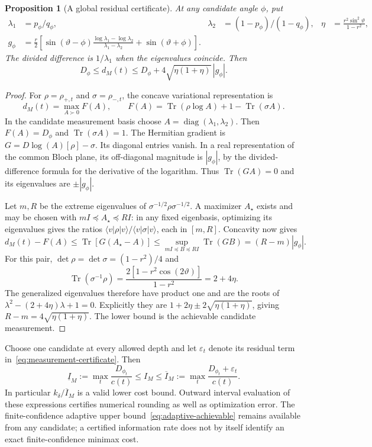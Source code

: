\documentclass[11pt,a4paper]{article}
\newcommand{\ket}[1]{\lvert #1\rangle}
\newcommand{\bra}[1]{\langle #1\rvert}
\newcommand{\Tr}{\operatorname{Tr}}
\newcommand{\diag}{\operatorname{diag}}
\newtheorem{proposition}[theorem]{Proposition}
\theoremstyle{definition}
\theoremstyle{remark}
\numberwithin{equation}{section}
\begin{document}
\begin{proposition}[A global residual certificate]\label{prop:residual}
At any candidate angle $\phi$, put
\begin{align}
 \lambda_1&=p_\phi/q_\phi,&
 \lambda_2&=(1-p_\phi)/(1-q_\phi),&
 \eta&=\frac{r^2\sin^2\vartheta}{1-r^2},\\
 g_\phi&=\frac r2\left[
  \sin(\vartheta-\phi)
  \frac{\log\lambda_1-\log\lambda_2}{\lambda_1-\lambda_2}
  +\sin(\vartheta+\phi)\right].&&&\label{eq:measurement-gradient}
\end{align}
The divided difference is $1/\lambda_1$ when the eigenvalues coincide.
Then
\begin{equation}\label{eq:measurement-certificate}
 D_\phi\leq d_M(t)\leq D_\phi+
                       4\sqrt{\eta(1+\eta)}\,|g_\phi|.
\end{equation}
\end{proposition}
\begin{proof}
For $\rho=\rho_{+,t}$ and $\sigma=\rho_{-,t}$, the concave variational
representation \citep[Lemma 1, Eq.~(4), and Theorem 2]{berta2017} is
\[
 d_M(t)=\max_{A\succ0}F(A),\qquad
 F(A)=\Tr(\rho\log A)+1-\Tr(\sigma A).
\]
In the candidate measurement basis choose
$A=\diag(\lambda_1,\lambda_2)$. Then $F(A)=D_\phi$ and
$\Tr(\sigma A)=1$. The Hermitian gradient is
$G=D\log(A)[\rho]-\sigma$. Its diagonal entries vanish. In a real
representation of the common Bloch plane, its off-diagonal magnitude
is $|g_\phi|$, by the divided-difference formula for the derivative of
the logarithm. Thus $\Tr(GA)=0$ and its eigenvalues are $\pm|g_\phi|$.

Let $m,R$ be the extreme eigenvalues of
$\sigma^{-1/2}\rho\sigma^{-1/2}$. A maximizer $A_\star$ exists and may
be chosen with $mI\preceq A_\star\preceq RI$: in any fixed eigenbasis,
optimizing its eigenvalues gives the ratios
$\bra{v}\rho\ket{v}/\bra{v}\sigma\ket{v}$, each in $[m,R]$.
Concavity now gives
\[
 d_M(t)-F(A)\leq\Tr[G(A_\star-A)]
 \leq\sup_{mI\preceq B\preceq RI}\Tr(GB)
 =(R-m)|g_\phi|.
\]
For this pair, $\det\rho=\det\sigma=(1-r^2)/4$ and
\[
 \Tr(\sigma^{-1}\rho)
 =\frac{2[1-r^2\cos(2\vartheta)]}{1-r^2}=2+4\eta.
\]
The generalized eigenvalues therefore have product one and are the roots
of $\lambda^2-(2+4\eta)\lambda+1=0$. Explicitly they are
$1+2\eta\pm2\sqrt{\eta(1+\eta)}$, giving
$R-m=4\sqrt{\eta(1+\eta)}$.
The lower bound is the achievable candidate measurement.
\end{proof}

Choose one candidate at every allowed depth and let $\varepsilon_t$
denote its residual term in~\eqref{eq:measurement-certificate}. Then
\begin{equation}\label{eq:rate-enclosure}
 \underline I_M:=\max_t\frac{D_{\phi_t}}{c(t)}
 \leq I_M\leq
 \overline I_M:=\max_t\frac{D_{\phi_t}+\varepsilon_t}{c(t)}.
\end{equation}
In particular $k_\delta/\overline I_M$ is a valid lower cost bound.
Outward interval evaluation of these expressions certifies numerical
rounding as well as optimization error. The finite-confidence adaptive
upper bound~\eqref{eq:adaptive-achievable} remains available from any
candidate; a certified information rate does not by itself identify an
exact finite-confidence minimax cost.
\end{document}
